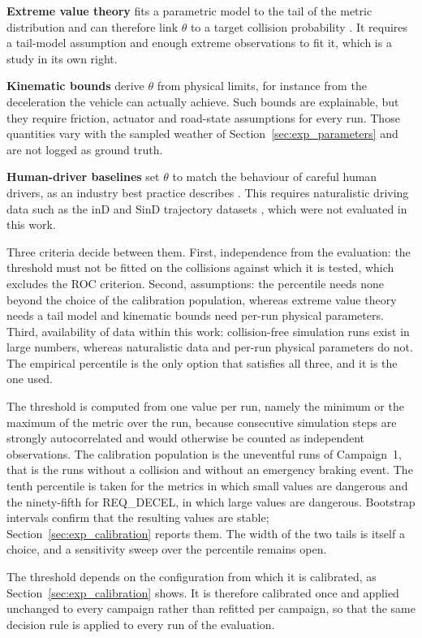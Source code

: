 \textbf{Extreme value theory} fits a parametric model to the tail of the metric
distribution and can therefore link $\theta$ to a target collision probability
\cite{songchitruksa2006evt}. It requires a
tail-model assumption and enough extreme observations to fit it, which is a study
in its own right.

\textbf{Kinematic bounds} derive $\theta$ from physical limits, for instance from
the deceleration the vehicle can actually achieve. Such bounds are explainable,
but they require friction, actuator and road-state assumptions for every run.
Those quantities vary with the sampled weather of
Section~\ref{sec:exp_parameters} and are not logged as ground truth.

\textbf{Human-driver baselines} set $\theta$ to match the behaviour of careful
human drivers, as an industry best practice describes \cite{avsc2023human}. This requires
naturalistic driving data such as the inD and SinD trajectory datasets
\cite{bock2020ind} \cite{xu2022sind}, which were not
evaluated in this work.

Three criteria decide between them. First, independence from the evaluation: the
threshold must not be fitted on the collisions against which it is tested, which
excludes the ROC criterion. Second, assumptions: the percentile needs none beyond
the choice of the calibration population, whereas extreme value theory needs a
tail model and kinematic bounds need per-run physical parameters. Third,
availability of data within this work: collision-free simulation runs exist in
large numbers, whereas naturalistic data and per-run physical parameters do not.
The empirical percentile is the only option that satisfies all three, and it is
the one used.

The threshold is computed from one value per run, namely the minimum or the
maximum of the metric over the run, because consecutive simulation steps are
strongly autocorrelated and would otherwise be counted as independent
observations. The calibration population is the uneventful runs of Campaign~1,
that is the runs without a collision and without an emergency braking event. The
tenth percentile is taken for the metrics in which small values are dangerous and
the ninety-fifth for REQ\_DECEL, in which large values are dangerous. Bootstrap
intervals confirm that the resulting values are stable;
Section~\ref{sec:exp_calibration} reports them. The width of the two tails is
itself a choice, and a sensitivity sweep over the percentile remains open.

The threshold depends on the configuration from which it is calibrated, as
Section~\ref{sec:exp_calibration} shows. It is therefore calibrated once and
applied unchanged to every campaign rather than refitted per campaign, so that
the same decision rule is applied to every run of the evaluation.


